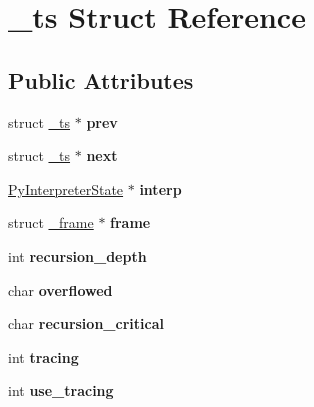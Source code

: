 \hypertarget{struct__ts}{}\section{\+\_\+ts Struct Reference}
\label{struct__ts}
\subsection*{Public Attributes}
\begin{DoxyCompactItemize}
\item 
struct \hyperlink{struct__ts}{\+\_\+ts} $\ast$ {\bfseries prev}\hypertarget{struct__ts_a0fe90a045d1bf855b2a02df1df775e16}{}\label{struct__ts_a0fe90a045d1bf855b2a02df1df775e16}

\item 
struct \hyperlink{struct__ts}{\+\_\+ts} $\ast$ {\bfseries next}\hypertarget{struct__ts_a07c61e6e5019334491b799a4a35a364c}{}\label{struct__ts_a07c61e6e5019334491b799a4a35a364c}

\item 
\hyperlink{struct__is}{Py\+Interpreter\+State} $\ast$ {\bfseries interp}\hypertarget{struct__ts_a218498c5d2725df0a11a604c873c7af2}{}\label{struct__ts_a218498c5d2725df0a11a604c873c7af2}

\item 
struct \hyperlink{struct__frame}{\+\_\+frame} $\ast$ {\bfseries frame}\hypertarget{struct__ts_a06cc5290746f822f1ef96a87983d0388}{}\label{struct__ts_a06cc5290746f822f1ef96a87983d0388}

\item 
int {\bfseries recursion\+\_\+depth}\hypertarget{struct__ts_a6b8d0637b018eecff79f70a6e23292ac}{}\label{struct__ts_a6b8d0637b018eecff79f70a6e23292ac}

\item 
char {\bfseries overflowed}\hypertarget{struct__ts_a3be91b6d624929de136249ce46671bfe}{}\label{struct__ts_a3be91b6d624929de136249ce46671bfe}

\item 
char {\bfseries recursion\+\_\+critical}\hypertarget{struct__ts_a5ad6a9cc55a6c7b6a4a9301e57c7f7a9}{}\label{struct__ts_a5ad6a9cc55a6c7b6a4a9301e57c7f7a9}

\item 
int {\bfseries tracing}\hypertarget{struct__ts_a471e83bc7094f90ee8ec4834eb240ad5}{}\label{struct__ts_a471e83bc7094f90ee8ec4834eb240ad5}

\item 
int {\bfseries use\+\_\+tracing}\hypertarget{struct__ts_acfef5d2d1002bcf0b14e4535e8a9827b}{}\label{struct__ts_acfef5d2d1002bcf0b14e4535e8a9827b}


\end{DoxyCompactItemize}
